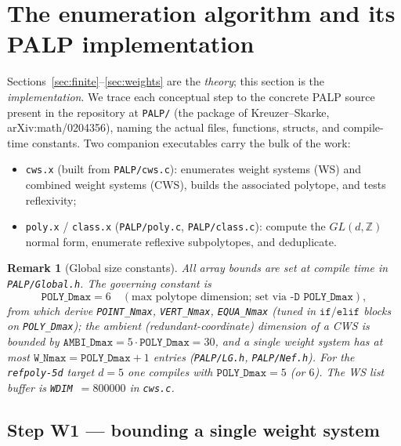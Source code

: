 \documentclass{amsart}
\newtheorem{remark}[theorem]{Remark}
\begin{document}
\section{The enumeration algorithm and its PALP implementation}
\label{sec:algo}

Sections~\ref{sec:finite}--\ref{sec:weights} are the \emph{theory}; this
section is the \emph{implementation}. We trace each conceptual step to the
concrete PALP source present in the repository at
\texttt{PALP/} (the package of Kreuzer--Skarke, arXiv:math/0204356), naming
the actual files, functions, structs, and compile-time constants. Two
companion executables carry the bulk of the work:
\begin{itemize}
  \item \texttt{cws.x} (built from \texttt{PALP/cws.c}): enumerates weight
        systems (WS) and combined weight systems (CWS), builds the
        associated polytope, and tests reflexivity;
  \item \texttt{poly.x} / \texttt{class.x} (\texttt{PALP/poly.c},
        \texttt{PALP/class.c}): compute the $GL(d,\mathbb{Z})$ normal form,
        enumerate reflexive subpolytopes, and deduplicate.
\end{itemize}

\begin{remark}[Global size constants]\label{rmk:constants}
All array bounds are set at compile time in \texttt{PALP/Global.h}. The
governing constant is
\begin{equation}
  \texttt{POLY\_Dmax} = 6
  \quad(\text{max polytope dimension; set via } \texttt{-D POLY\_Dmax}),
\end{equation}
from which derive \texttt{POINT\_Nmax}, \texttt{VERT\_Nmax},
\texttt{EQUA\_Nmax} (tuned in $\texttt{if}/\texttt{elif}$ blocks on
\texttt{POLY\_Dmax}); the \emph{ambient} (redundant-coordinate) dimension of
a CWS is bounded by $\texttt{AMBI\_Dmax} = 5\cdot\texttt{POLY\_Dmax} = 30$,
and a single weight system has at most $\texttt{W\_Nmax} = \texttt{POLY\_Dmax}+1$
entries (\texttt{PALP/LG.h}, \texttt{PALP/Nef.h}). For the \texttt{refpoly-5d}
target $d=5$ one compiles with $\texttt{POLY\_Dmax}=5$ (or $6$). The WS list
buffer is \texttt{WDIM}~$=800000$ in \texttt{cws.c}.
\end{remark}

\subsection{Step W1 --- bounding a single weight system}
\label{sec:algo-singleWS}
\end{document}
